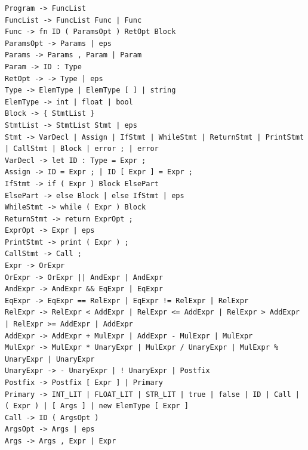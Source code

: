 \begin{lstlisting}[]
Program -> FuncList
FuncList -> FuncList Func | Func
Func -> fn ID ( ParamsOpt ) RetOpt Block
ParamsOpt -> Params | eps
Params -> Params , Param | Param
Param -> ID : Type
RetOpt -> -> Type | eps
Type -> ElemType | ElemType [ ] | string
ElemType -> int | float | bool
Block -> { StmtList }
StmtList -> StmtList Stmt | eps
Stmt -> VarDecl | Assign | IfStmt | WhileStmt | ReturnStmt | PrintStmt | CallStmt | Block | error ; | error
VarDecl -> let ID : Type = Expr ;
Assign -> ID = Expr ; | ID [ Expr ] = Expr ;
IfStmt -> if ( Expr ) Block ElsePart
ElsePart -> else Block | else IfStmt | eps
WhileStmt -> while ( Expr ) Block
ReturnStmt -> return ExprOpt ;
ExprOpt -> Expr | eps
PrintStmt -> print ( Expr ) ;
CallStmt -> Call ;
Expr -> OrExpr
OrExpr -> OrExpr || AndExpr | AndExpr
AndExpr -> AndExpr && EqExpr | EqExpr
EqExpr -> EqExpr == RelExpr | EqExpr != RelExpr | RelExpr
RelExpr -> RelExpr < AddExpr | RelExpr <= AddExpr | RelExpr > AddExpr | RelExpr >= AddExpr | AddExpr
AddExpr -> AddExpr + MulExpr | AddExpr - MulExpr | MulExpr
MulExpr -> MulExpr * UnaryExpr | MulExpr / UnaryExpr | MulExpr % UnaryExpr | UnaryExpr
UnaryExpr -> - UnaryExpr | ! UnaryExpr | Postfix
Postfix -> Postfix [ Expr ] | Primary
Primary -> INT_LIT | FLOAT_LIT | STR_LIT | true | false | ID | Call | ( Expr ) | [ Args ] | new ElemType [ Expr ]
Call -> ID ( ArgsOpt )
ArgsOpt -> Args | eps
Args -> Args , Expr | Expr
\end{lstlisting}
